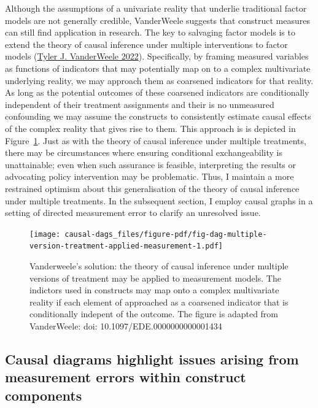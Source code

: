\documentclass[
  singlecolumn]{report}
\begin{document}
Although the assumptions of a univariate reality that underlie
traditional factor models are not generally credible, VanderWeele
suggests that construct measures can still find application in research.
The key to salvaging factor models is to extend the theory of causal
inference under multiple interventions to factor models
(\protect\hyperlink{ref-vanderweele2022}{Tyler J. VanderWeele 2022}).
Specifically, by framing measured variables as functions of indicators
that may potentially map on to a complex multivariate underlying
reality, we may approach them as coarsened indicators for that reality.
As long as the potential outcomes of these coarsened indicators are
conditionally independent of their treatment assignments and their is no
unmeasured confounding we may assume the constructs to consistently
estimate causal effects of the complex reality that gives rise to them.
This approach is is depicted in
Figure~\ref{fig-dag-multiple-version-treatment-applied-measurement}.
Just as with the theory of causal inference under multiple treatments,
there may be circumstances where ensuring conditional exchangeability is
unattainable; even when such assurance is feasible, interpreting the
results or advocating policy intervention may be problematic. Thus, I
maintain a more restrained optimism about this generalisation of the
theory of causal inference under multiple treatments. In the subsequent
section, I employ causal graphs in a setting of directed measurement
error to clarify an unresolved issue.

\begin{figure}

{\centering \texttt{[image: causal-dags\_files/figure-pdf/fig-dag-multiple-version-treatment-applied-measurement-1.pdf]}

}

\caption{\label{fig-dag-multiple-version-treatment-applied-measurement}Vanderweele's
solution: the theory of causal inference under multiple versions of
treatment may be applied to measurement models. The indictors used in
constructs may map onto a complex multivariate reality if each element
of approached as a coarsened indicator that is conditionally indepent of
the outcome. The figure is adapted from VanderWeele: doi:
10.1097/EDE.0000000000001434}

\end{figure}

\hypertarget{causal-diagrams-highlight-issues-arising-from-measurement-errors-within-construct-components}{%
\subsection{Causal diagrams highlight issues arising from measurement
errors within construct
components}\label{causal-diagrams-highlight-issues-arising-from-measurement-errors-within-construct-components}}
\end{document}
